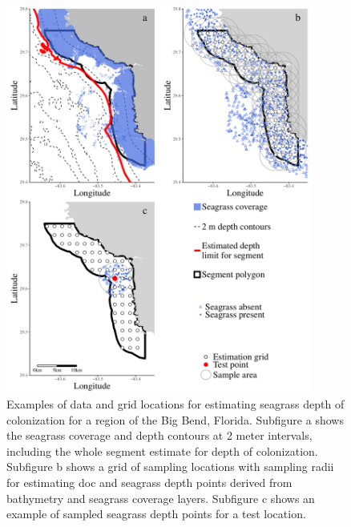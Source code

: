 \documentclass[letterpaper,12pt,oneside]{article}\usepackage[]{graphicx}\usepackage[]{color}
\begin{document}
\begin{figure}
\centering
\includegraphics[width=0.9\textwidth]{figs/Fig1.pdf}
\caption{Examples of data and grid locations for estimating seagrass depth of colonization for a region of the Big Bend, Florida.  Subfigure a shows the seagrass coverage and depth contours at 2 meter intervals, including the whole segment estimate for depth of colonization. Subfigure b shows a grid of sampling locations with sampling radii for estimating \ac{doc} and seagrass depth points derived from bathymetry and seagrass coverage layers.  Subfigure c shows an example of sampled seagrass depth points for a test location.}
\label{fig:buff_ex}
\end{figure}
\end{document}
